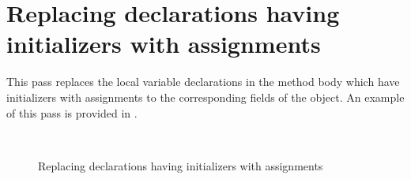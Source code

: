 \section{Replacing declarations having initializers with assignments}

This pass replaces the local variable declarations in the method body which have initializers with assignments to the
corresponding fields of the  object. An example of this pass is provided in
.

\begin{figure}[htb]
    \\
    \caption{Replacing declarations having initializers with assignments \label{img:replace-declaration}}
\end{figure}